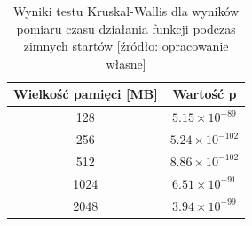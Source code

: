 \begin{table}[H]
    \centering
    \caption{Wyniki testu Kruskal-Wallis dla wyników pomiaru czasu działania funkcji podczas zimnych startów [źródło: opracowanie własne]}
    \begin{tabular}{|c|c|}
    \hline
    \textbf{Wielkość pamięci [MB]} & \textbf{Wartość p} \\
    \hline
    128 & $5.15 \times 10^{-89}$ \\
    \hline
    256 & $5.24 \times 10^{-102}$ \\
    \hline
    512 & $8.86 \times 10^{-102}$ \\
    \hline
    1024 & $6.51 \times 10^{-91}$ \\
    \hline
    2048 & $3.94 \times 10^{-99}$ \\
    \hline
    \end{tabular}
    \label{table:kruskal_wallis_test_cold_starts}
\end{table}

